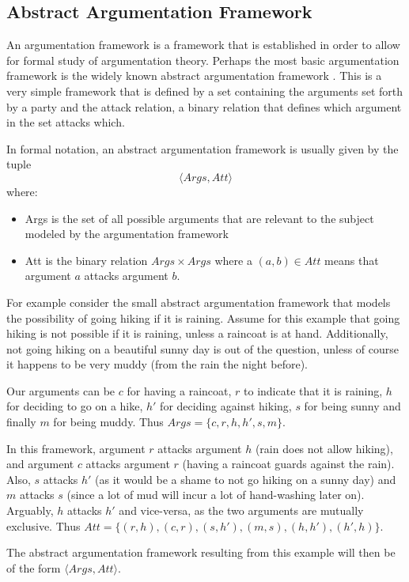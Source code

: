 \documentclass[11pt,twoside,a4paper]{report}
\begin{document}
\subsection{Abstract Argumentation Framework}
\label{subsec:abrstrargframework}
An argumentation framework is a framework that is established in order to allow for formal study of argumentation theory. Perhaps the most basic argumentation framework is the widely known abstract argumentation framework \citep*{dung95}. This is a very simple framework that is defined by a set containing the arguments set forth by a party and the attack relation, a binary relation that defines which argument in the set attacks which.

In formal notation, an abstract argumentation framework is usually given by the tuple
\[\langle Args, Att\rangle\]
where:
\begin{itemize}
\item
Args is the set of all possible arguments that are relevant to the subject modeled by the argumentation framework
\item
Att is the binary relation $Args\times Args$ where a $(a, b)\in Att$ means that argument $a$ attacks argument $b$.
\end{itemize}

For example consider the small abstract argumentation framework that models the possibility of going hiking if it is raining. Assume for this example that going hiking is not possible if it is raining, unless a raincoat is at hand. Additionally, not going hiking on a beautiful sunny day is out of the question, unless of course it happens to be very muddy (from the rain the night before).

Our arguments can be $c$ for having a raincoat, $r$ to indicate that it is raining, $h$ for deciding to go on a hike, $h'$ for deciding against hiking, $s$ for being sunny and finally $m$ for being muddy. Thus $Args = \{c, r, h, h', s, m\}$.

In this framework, argument $r$ attacks argument $h$ (rain does not allow hiking), and argument $c$ attacks argument $r$ (having a raincoat guards against the rain). Also, $s$ attacks $h'$ (as it would be a shame to not go hiking on a sunny day) and $m$ attacks $s$ (since a lot of mud will incur a lot of hand-washing later on). Arguably, $h$ attacks $h'$ and vice-versa, as the two arguments are mutually exclusive. Thus $Att = \{(r, h), (c, r), (s, h'), (m, s), (h, h'), (h', h)\}$.

The abstract argumentation framework resulting from this example will then be of the form $\langle Args, Att\rangle$.
\end{document}
